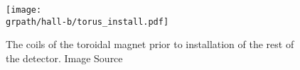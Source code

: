 \begin{figure}\begin{center}
\texttt{[image: \\grpath/hall-b/torus\_install.pdf]}
\caption[Hall ]{\label{fig:torusinstall}{}The coils of the  toroidal magnet prior to installation of the rest of the detector. Image Source~\cite{williams}}
\end{center}\end{figure}













%
%
%








